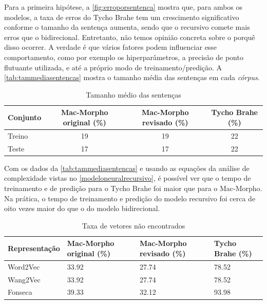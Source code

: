 Para a primeira hipótese, a \autoref{fig:erroporsentenca} mostra que, para ambos os modelos, a taxa de erros do Tycho Brahe tem um crescimento significativo conforme o tamanho da sentença aumenta, sendo que o recursivo comete mais erros que o bidirecional. Entretanto, não temos opinião concreta sobre o porquê disso ocorrer. A verdade é que vários fatores podem influenciar esse comportamento, como por exemplo os hiperparâmetros, a precisão de ponto flutuante utilizada, e até a próprio modo de treinamento/predição. A \autoref{tab:tammediasentencas} mostra o tamanho média das sentenças em cada \textit{córpus}.



\begin{table}[!htb]
\footnotesize
\centering
\caption{Tamanho médio das sentenças}
\label{tab:tammediasentencas}
\begin{tabular}{lccc}
  \toprule
  \textbf{Conjunto} & \textbf{Mac-Morpho original (\%)}  & \textbf{Mac-Morpho revisado (\%)} & \textbf{Tycho Brahe (\%)} \\
  \midrule
  Treino & 19 & 19 & 22 \\ 
  Teste  & 17 & 17 & 22 \\ 
  \bottomrule
\end{tabular}
\end{table}

Com os dados da \autoref{tab:tammediasentencas} e usando as equações da análise de complexidade vistas no \autoref{modeloneuralrecursivo}, é possível ver que o tempo de treinamento e de predição para o Tycho Brahe foi maior que para o Mac-Morpho. Na prática, o tempo de treinamento e predição do modelo recursivo foi cerca de oito vezes maior do que o do modelo bidirecional.


\begin{table}[!htb]
\footnotesize
\centering
\caption{Taxa de vetores não encontrados}
\label{tab:vetoresnaoencontrados}
\begin{tabular}{lP{3cm}P{3cm}P{3cm}}
  \toprule
  \textbf{Representação} & \textbf{Mac-Morpho original (\%)}  & \textbf{Mac-Morpho revisado (\%)} & \textbf{Tycho Brahe (\%)} \\
  \midrule
  Word2Vec  & 33.92 & 27.74 & 78.52 \\ 
  Wang2Vec  & 33.92 & 27.74 & 78.52 \\
  Fonseca 	& 39.33 & 32.12 & 93.98 \\
  \bottomrule
\end{tabular}
\end{table}


